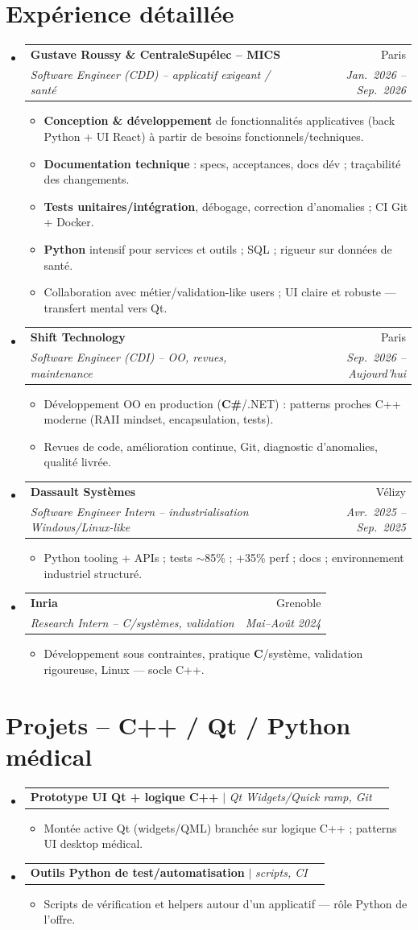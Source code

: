 \documentclass[a4paper,10.5pt]{article}
\makeatletter
\newcommand{\resumeItem}[1]{\item\small{#1}}
\newcommand{\resumeSubheading}[4]{\vspace{2.5pt}\item\begin{tabular*}{0.97\textwidth}[t]{l@{\extracolsep{\fill}}r}\textbf{#1}&{#2}\\\textit{\small #3}&\textit{\small #4}\\\end{tabular*}\vspace{1pt}}
\newcommand{\resumeProjectHeading}[2]{\vspace{1.5pt}\item\begin{tabular*}{0.97\textwidth}{l@{\extracolsep{\fill}}r}\small #1&#2\\\end{tabular*}\vspace{1pt}}
\newcommand{\resumeSubHeadingListStart}{\begin{itemize}[leftmargin=0.08in,label={}]}
\newcommand{\resumeSubHeadingListEnd}{\end{itemize}}
\makeatother
\begin{document}
\section{Exp\'erience d\'etaill\'ee}
\resumeSubHeadingListStart
  \resumeSubheading
    {Gustave Roussy \& CentraleSup\'elec -- MICS}{Paris}
    {Software Engineer (CDD) -- applicatif exigeant / sant\'e}{Jan.~2026 -- Sep.~2026}
    \begin{itemize}
      \resumeItem{\textbf{Conception \& d\'eveloppement} de fonctionnalit\'es applicatives (back Python + UI React) \`a partir de besoins fonctionnels/techniques.}
      \resumeItem{\textbf{Documentation technique} : specs, acceptances, docs d\'ev ; tra\c{c}abilit\'e des changements.}
      \resumeItem{\textbf{Tests unitaires/int\'egration}, d\'ebogage, correction d'anomalies ; CI Git + Docker.}
      \resumeItem{\textbf{Python} intensif pour services et outils ; SQL ; rigueur sur donn\'ees de sant\'e.}
      \resumeItem{Collaboration avec m\'etier/validation-like users ; UI claire et robuste --- transfert mental vers Qt.}
    \end{itemize}
  \resumeSubheading
    {Shift Technology}{Paris}
    {Software Engineer (CDI) -- OO, revues, maintenance}{Sep.~2026 -- Aujourd'hui}
    \begin{itemize}
      \resumeItem{D\'eveloppement OO en production (\textbf{C\#}/.NET) : patterns proches C++ moderne (RAII mindset, encapsulation, tests).}
      \resumeItem{Revues de code, am\'elioration continue, Git, diagnostic d'anomalies, qualit\'e livr\'ee.}
    \end{itemize}
  \resumeSubheading
    {Dassault Syst\`emes}{V\'elizy}
    {Software Engineer Intern -- industrialisation Windows/Linux-like}{Avr.~2025 -- Sep.~2025}
    \begin{itemize}
      \resumeItem{Python tooling + APIs ; tests $\sim$85\% ; +35\% perf ; docs ; environnement industriel structur\'e.}
    \end{itemize}
  \resumeSubheading
    {Inria}{Grenoble}
    {Research Intern -- C/syst\`emes, validation}{Mai--Ao\^ut 2024}
    \begin{itemize}
      \resumeItem{D\'eveloppement sous contraintes, pratique \textbf{C}/syst\`eme, validation rigoureuse, Linux --- socle C++.}
    \end{itemize}
\resumeSubHeadingListEnd

\section{Projets -- C++ / Qt / Python m\'edical}
\resumeSubHeadingListStart
  \resumeProjectHeading{\textbf{Prototype UI Qt + logique C++} $|$ \emph{Qt Widgets/Quick ramp, Git}}{}
  \begin{itemize}\resumeItem{Mont\'ee active Qt (widgets/QML) branch\'ee sur logique C++ ; patterns UI desktop m\'edical.}\end{itemize}
  \resumeProjectHeading{\textbf{Outils Python de test/automatisation} $|$ \emph{scripts, CI}}{}
  \begin{itemize}\resumeItem{Scripts de v\'erification et helpers autour d'un applicatif --- r\^ole Python de l'offre.}\end{itemize}
\resumeSubHeadingListEnd
\end{document}
